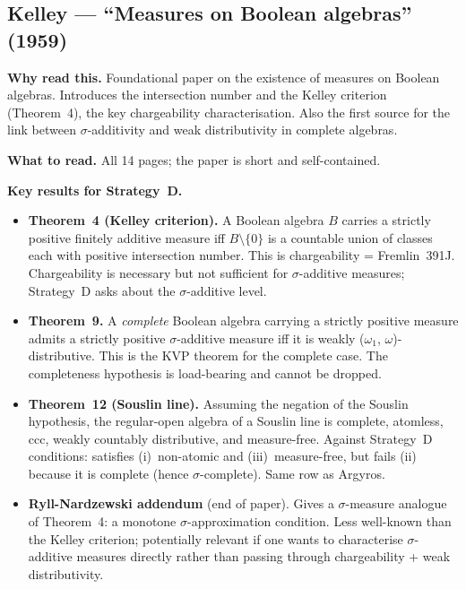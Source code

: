 \subsection*{Kelley --- ``Measures on Boolean algebras'' (1959)}

\textbf{Why read this.}  Foundational paper on the existence of
measures on Boolean algebras.  Introduces the intersection number
and the Kelley criterion (Theorem~4), the key chargeability
characterisation.  Also the first source for the link between
$\sigma$-additivity and weak distributivity in complete algebras.

\medskip\noindent
\textbf{What to read.}  All 14 pages; the paper is short and
self-contained.

\medskip\noindent
\textbf{Key results for Strategy~D.}

\begin{itemize}[nosep]
  \item \textbf{Theorem~4 (Kelley criterion).}  A Boolean algebra
    $B$ carries a strictly positive finitely additive measure iff
    $B \setminus \{0\}$ is a countable union of classes each with
    positive intersection number.  This is chargeability =
    Fremlin~391J.  Chargeability is necessary but not sufficient
    for $\sigma$-additive measures; Strategy~D asks about the
    $\sigma$-additive level.

  \item \textbf{Theorem~9.}  A \emph{complete} Boolean algebra
    carrying a strictly positive measure admits a strictly positive
    $\sigma$-additive measure iff it is weakly ($\omega_1$,
    $\omega$)-distributive.  This is the KVP theorem for the
    complete case.  The completeness hypothesis is load-bearing
    and cannot be dropped.

  \item \textbf{Theorem~12 (Souslin line).}  Assuming the negation
    of the Souslin hypothesis, the regular-open algebra of a Souslin
    line is complete, atomless, ccc, weakly countably distributive,
    and measure-free.  Against Strategy~D conditions: satisfies
    (i)~non-atomic and (iii)~measure-free, but fails (ii) because
    it is complete (hence $\sigma$-complete).  Same row as Argyros.

  \item \textbf{Ryll-Nardzewski addendum} (end of paper).  Gives a
    $\sigma$-measure analogue of Theorem~4: a monotone
    $\sigma$-approximation condition.  Less well-known than the
    Kelley criterion; potentially relevant if one wants to
    characterise $\sigma$-additive measures directly rather than
    passing through chargeability + weak distributivity.
\end{itemize}

